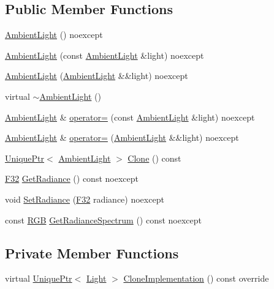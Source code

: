 \subsection*{Public Member Functions}
\begin{DoxyCompactItemize}
\item 
\hyperlink{classmage_1_1_ambient_light_a9f1aa7ecfbb56ecc10f8d149272e0f51}{Ambient\+Light} () noexcept
\item 
\hyperlink{classmage_1_1_ambient_light_acd05bee97c195c1a18242879008bf4ae}{Ambient\+Light} (const \hyperlink{classmage_1_1_ambient_light}{Ambient\+Light} \&light) noexcept
\item 
\hyperlink{classmage_1_1_ambient_light_a2807ca8add5f34da2e63ef8fdb80f7e1}{Ambient\+Light} (\hyperlink{classmage_1_1_ambient_light}{Ambient\+Light} \&\&light) noexcept
\item 
virtual \hyperlink{classmage_1_1_ambient_light_a511bb794b11f112e750da09f4044e7db}{$\sim$\+Ambient\+Light} ()
\item 
\hyperlink{classmage_1_1_ambient_light}{Ambient\+Light} \& \hyperlink{classmage_1_1_ambient_light_aa6f399dfc958a0073d93f98f0e8f0069}{operator=} (const \hyperlink{classmage_1_1_ambient_light}{Ambient\+Light} \&light) noexcept
\item 
\hyperlink{classmage_1_1_ambient_light}{Ambient\+Light} \& \hyperlink{classmage_1_1_ambient_light_ab12de420bef6074ef3ed3c4986d18621}{operator=} (\hyperlink{classmage_1_1_ambient_light}{Ambient\+Light} \&\&light) noexcept
\item 
\hyperlink{namespacemage_a3316d7143a973e37adf1110f2e80ca31}{Unique\+Ptr}$<$ \hyperlink{classmage_1_1_ambient_light}{Ambient\+Light} $>$ \hyperlink{classmage_1_1_ambient_light_a542a68882bc0807cf5f9a37391b9f44e}{Clone} () const
\item 
\hyperlink{namespacemage_aa97e833b45f06d60a0a9c4fc22ae02c0}{F32} \hyperlink{classmage_1_1_ambient_light_ab41f72d902f590ebc62ab58427e2bdab}{Get\+Radiance} () const noexcept
\item 
void \hyperlink{classmage_1_1_ambient_light_aac9a833f2261eaa1bf5eaab7608fc878}{Set\+Radiance} (\hyperlink{namespacemage_aa97e833b45f06d60a0a9c4fc22ae02c0}{F32} radiance) noexcept
\item 
const \hyperlink{structmage_1_1_r_g_b}{R\+GB} \hyperlink{classmage_1_1_ambient_light_a5d135eeeef619f13435341eebd3fe476}{Get\+Radiance\+Spectrum} () const noexcept
\end{DoxyCompactItemize}
\subsection*{Private Member Functions}
\begin{DoxyCompactItemize}
\item 
virtual \hyperlink{namespacemage_a3316d7143a973e37adf1110f2e80ca31}{Unique\+Ptr}$<$ \hyperlink{classmage_1_1_light}{Light} $>$ \hyperlink{classmage_1_1_ambient_light_a7223a4770653c20e662810b0956c6e51}{Clone\+Implementation} () const override
\end{DoxyCompactItemize}
